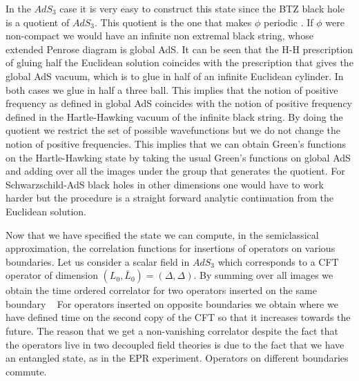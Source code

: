 In the $AdS_3$ case it is very easy to construct this state since
the BTZ black hole is a quotient of $AdS_3$. This quotient 
is the one that makes $\phi$ periodic \btzpaper .
 If $\phi$ were non-compact we
would have an infinite non extremal black string, 
whose extended Penrose diagram
is  global AdS. 
It can be seen that the H-H prescription of gluing half the Euclidean
solution coincides with the prescription that gives the global AdS vacuum,
which is to glue in half of an infinite Euclidean cylinder. In 
both cases we glue in half a three ball. 
This implies that the notion of positive
frequency as defined in global AdS coincides with the notion of positive
frequency defined in the Hartle-Hawking 
 vacuum of the infinite black string. By 
doing the quotient we restrict the set of possible wavefunctions but we
do not change the notion of positive frequencies. This implies that 
we can obtain  Green's functions on the Hartle-Hawking state by 
taking the usual Green's functions on global AdS and adding over 
all the images under the group that generates the quotient. 
For Schwarzschild-AdS black holes in other dimensions
 one would have to work harder but the procedure is 
a straight forward analytic continuation from the Euclidean 
solution.


Now that we have specified the state 
we can compute, in the semiclassical
approximation,   the correlation functions 
for insertions of operators on various boundaries.
Let us  consider a scalar field in $AdS_3$ which corresponds to a CFT
operator of dimension $(L_0,\bar L_0) = (\Delta,\Delta)$. By summing
over all images we obtain the time ordered correlator for two 
operators inserted on the same boundary  \esko\ 
\eqn{}
For operators inserted on opposite boundaries we obtain
\eqn{}
where  we have defined
time on the second copy of the CFT so that it increases towards the
future.
The reason that we get a non-vanishing correlator despite the fact that
the operators live in two decoupled field theories is due to the
fact that we have an entangled state, as in  the  EPR experiment. 
Operators on different boundaries commute.



